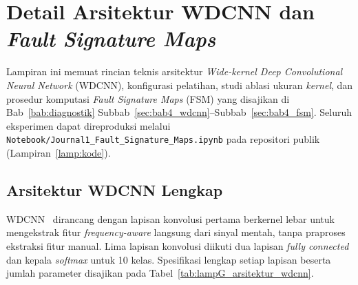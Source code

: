 ﻿%

\chapter{Detail Arsitektur WDCNN dan \emph{Fault Signature Maps}}
\label{lamp:wdcnn_fsm}

Lampiran ini memuat rincian teknis arsitektur \emph{Wide-kernel Deep
Convolutional Neural Network} (WDCNN), konfigurasi pelatihan,
studi ablasi ukuran \emph{kernel}, dan prosedur komputasi
\emph{Fault Signature Maps} (FSM) yang disajikan di
Bab~\ref{bab:diagnostik} Subbab~\ref{sec:bab4_wdcnn}--Subbab~\ref{sec:bab4_fsm}.
Seluruh eksperimen dapat direproduksi melalui
\texttt{Notebook/Journal1\_Fault\_Signature\_Maps.ipynb}
pada repositori publik (Lampiran~\ref{lamp:kode}).

\section{Arsitektur WDCNN Lengkap}
\label{lamp:wdcnn_arsitektur}

WDCNN~ dirancang dengan lapisan konvolusi
pertama berkernel lebar untuk mengekstrak fitur \emph{frequency-aware}
langsung dari sinyal mentah, tanpa praproses ekstraksi fitur manual.
Lima lapisan konvolusi diikuti dua lapisan \emph{fully connected}
dan kepala \emph{softmax} untuk 10 kelas. Spesifikasi lengkap setiap
lapisan beserta jumlah parameter disajikan pada
Tabel~\ref{tab:lampG_arsitektur_wdcnn}.

